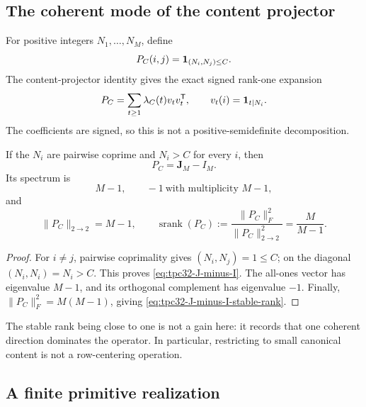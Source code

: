 \subsection{The coherent mode of the content projector}

For positive integers $N_1,\ldots,N_M$, define
\begin{equation}
 P_C(i,j)=\mathbf 1_{(N_i,N_j)\le C}.
 \label{eq:tpc32-content-matrix}
\end{equation}
The content-projector identity gives the exact signed rank-one expansion
\begin{equation}
 P_C=\sum_{t\ge1}\lambda_C(t)v_tv_t^{\mathsf T},
 \qquad
 v_t(i)=\mathbf 1_{t\mid N_i}.
 \label{eq:tpc32-content-rank-one-expansion}
\end{equation}
The coefficients are signed, so this is not a positive-semidefinite
decomposition.

\begin{proposition}
\label{prop:tpc32-coherent-content}
If the $N_i$ are pairwise coprime and $N_i>C$ for every $i$, then
\begin{equation}
 P_C=\mathbf J_M-I_M.
 \label{eq:tpc32-J-minus-I}
\end{equation}
Its spectrum is
\begin{equation}
 M-1,\qquad -1\ \text{with multiplicity }M-1,
 \label{eq:tpc32-J-minus-I-spectrum}
\end{equation}
and
\begin{equation}
 \|P_C\|_{2\to2}=M-1,
 \qquad
 \operatorname{srank}(P_C)
 :=\frac{\|P_C\|_{F}^{2}}{\|P_C\|_{2\to2}^{2}}
 =\frac{M}{M-1}.
 \label{eq:tpc32-J-minus-I-stable-rank}
\end{equation}
\end{proposition}

\begin{proof}
For $i\ne j$, pairwise coprimality gives $(N_i,N_j)=1\le C$; on the
diagonal $(N_i,N_i)=N_i>C$.  This proves \eqref{eq:tpc32-J-minus-I}.
The all-ones vector has eigenvalue $M-1$, and its orthogonal complement has
eigenvalue $-1$.  Finally,
$\|P_C\|_F^2=M(M-1)$, giving
\eqref{eq:tpc32-J-minus-I-stable-rank}.
\end{proof}

The stable rank being close to one is not a gain here: it records that one
coherent direction dominates the operator.  In particular, restricting to
small canonical content is not a row-centering operation.

\subsection{A finite primitive realization}

